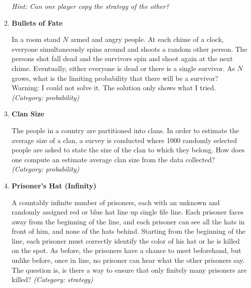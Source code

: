 \begin{enumerate}
\small\emph{Hint: Can one player copy the strategy of the other?}





\item \textbf{Bullets of Fate}

In a room stand $N$ armed and angry people. At each chime of a clock, everyone simultaneously spins around and shoots a random other person. The persons shot fall dead and the survivors spin and shoot again at the next chime. Eventually, either everyone is dead or there is a single survivor.
As $N$ grows, what is the limiting probability that there will be a survivor?
Warning: I could not solve it. The solution only shows what I tried.
\small\emph{(Category: probability)}




\item \textbf{Clan Size}

The people in a country are partitioned into clans.  In order to estimate the average size of a clan, a survey is conducted where 1000 randomly selected people are asked to state the size of the clan to which they belong.  How does one compute an estimate average clan size from the data collected?
\small\emph{(Category: probability)}




\item \textbf{Prisoner's Hat (Infinity)}

A countably infinite number of prisoners, each with an unknown and randomly assigned red or blue hat line up single file line. Each prisoner faces away from the beginning of the line, and each prisoner can see all the hats in front of him, and none of the hats behind. Starting from the beginning of the line, each prisoner must correctly identify the color of his hat or he is killed on the spot. As before, the prisoners have a chance to meet beforehand, but unlike before, once in line, no prisoner can hear what the other prisoners say. The question is, is there a way to ensure that only finitely many prisoners are killed?
\small\emph{(Category: strategy)}


\end{enumerate}
